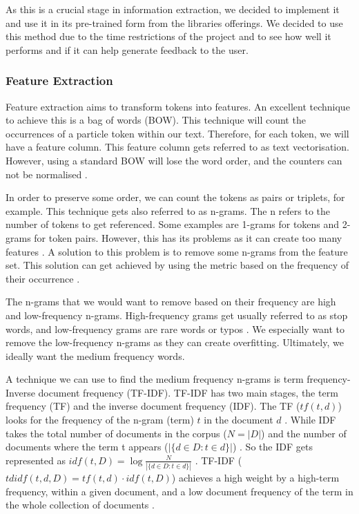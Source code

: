 	As this is a crucial stage in information extraction, we decided to implement it and use it in its pre-trained form from the libraries offerings. We decided to use this method due to the time restrictions of the project and to see how well it performs and if it can help generate feedback to the user.
	
	
	\subsubsection{Feature Extraction}
	Feature extraction aims to transform tokens into features. An excellent technique to achieve this is a bag of words (BOW). This technique will count the occurrences of a particle token within our text. Therefore, for each token, we will have a feature column. This feature column gets referred to as text vectorisation. However, using a standard BOW will lose the word order, and the counters can not be normalised \cite{hapke2019natural}. 
	
	In order to preserve some order, we can count the tokens as pairs or triplets, for example. This technique gets also referred to as n-grams. The n refers to the number of tokens to get referenced. Some examples are 1-grams for tokens and 2-grams for token pairs. However, this has its problems as it can create too many features \cite{vajjala2020practical}. A solution to this problem is to remove some n-grams from the feature set. This solution can get achieved by using the metric based on the frequency of their occurrence \cite{vajjala2020practical}.
	
	The n-grams that we would want to remove based on their frequency are high and low-frequency n-grams. High-frequency grams get usually referred to as stop words, and low-frequency grams are rare words or typos \cite{hapke2019natural}. We especially want to remove the low-frequency n-grams as they can create overfitting. Ultimately, we ideally want the medium frequency words.
	
	A technique we can use to find the medium frequency n-grams is term frequency-Inverse document frequency (TF-IDF). TF-IDF has two main stages, the term frequency (TF) and the inverse document frequency (IDF). The TF ($tf(t,d)$) looks for the frequency of the n-gram (term) $t$ in the document $d$ \cite{sarkar2016text}. While IDF takes the total number of documents in the corpus ($N = |D|$) and the number of documents where the term t appears ($|\{d \in D:t \in d\}|$) \cite{sarkar2016text}. So the IDF gets represented as $idf(t,D) = \log\frac{N}{|\{d \in D:t \in d\}|}$ \cite{sarkar2016text}. TF-IDF ($tdidf(t,d,D) = tf(t,d) \cdot idf(t,D)$) achieves a high weight by a high-term frequency, within a given document, and a low  document frequency of the term in the whole collection of documents \cite{sarkar2016text}.
	
